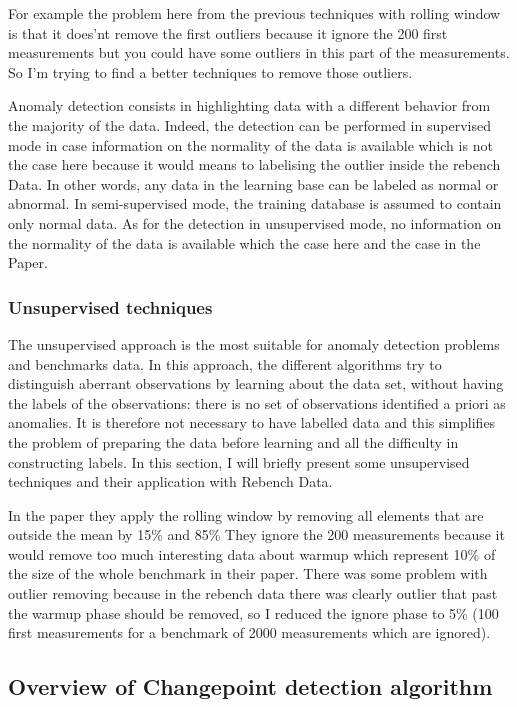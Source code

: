 \documentclass{article}
\begin{document}
For example the problem here from the previous techniques with rolling window is that it does'nt remove the first outliers because it ignore the 200 first measurements but you could have some outliers in this part of the measurements. So I'm trying to find a better techniques to remove those outliers.

Anomaly detection consists in highlighting data with a different behavior from the majority of the data. 
Indeed, the detection can be performed in supervised mode in case information on the normality of the data is available which is not the case here because it would means to labelising the outlier inside the rebench Data. In other words, any data in the learning base can be labeled as normal or abnormal. In semi-supervised mode, the training database is assumed to contain only normal data. 
As for the detection in unsupervised mode, no information on the normality of the data is available which the case here and the case in the \cite{barrett2017virtual} Paper. 

\subsubsection{Unsupervised techniques}
The unsupervised approach is the most suitable for anomaly detection problems and benchmarks data. In this approach, the different algorithms try to distinguish aberrant observations by learning about the data set, without having the labels of the observations: there is no set of observations identified a priori as anomalies. It is therefore not necessary to have labelled data and this simplifies the problem of preparing the data before learning and all the difficulty in constructing labels. In this section, I will briefly present some unsupervised techniques and their application with Rebench Data.

In the paper they apply the rolling window by removing all elements that are outside the mean by 15\% and 85\% They ignore the 200 measurements because it would remove too much interesting data about warmup which represent 10\% of the size of the whole benchmark in their paper. There was some problem with outlier removing because in the rebench data there was clearly outlier that past the warmup phase should be removed, so I reduced the ignore phase to 5\% (100 first measurements for a benchmark of 2000 measurements  which are ignored).



\subsection{Overview of Changepoint detection algorithm}
\end{document}
